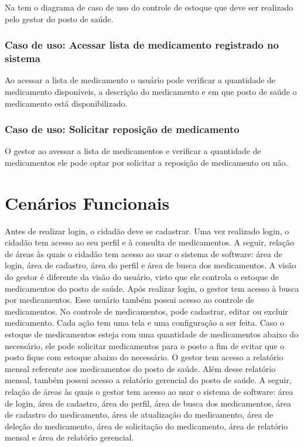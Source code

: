 Na  tem o diagrama de caso de uso do controle de estoque que deve ser realizado pelo gestor do posto de saúde.



\subsubsection{Caso de uso: Acessar lista de medicamento registrado no sistema}

Ao acessar a lista de medicamento o usuário pode verificar a quantidade de medicamento disponíveis, a descrição do medicamento e em que posto de saúde o medicamento está disponibilizado.

\subsubsection{Caso de uso: Solicitar reposição de medicamento}

O gestor ao avessar a lista de medicamentos e verificar a quantidade de medicamentos ele pode optar por solicitar a reposição de medicamento ou não.



\section{Cenários Funcionais}

Antes de realizar login, o cidadão deve se cadastrar. Uma vez realizado login, o cidadão tem acesso ao seu perfil e à consulta de medicamentos. A seguir, relação de áreas às quais o cidadão tem acesso ao usar o sistema de software: área de login, área de cadastro, área do perfil e área de busca dos medicamentos. A visão do gestor é diferente da visão do usuário, visto que ele controla o estoque de medicamentos do posto de saúde. Após realizar login, o gestor tem acesso à busca por medicamentos. Esse usuário também possui acesso ao controle de medicamentos. No controle de medicamentos, pode cadastrar, editar ou excluir medicamento. Cada ação tem uma tela e uma configuração a ser feita. Caso o estoque de medicamentos esteja com uma quantidade de medicamentos abaixo do necessário, ele pode solicitar medicamentos para o posto a fim de evitar que o posto fique com estoque abaixo do necessário. O gestor tem acesso a relatório mensal referente aos medicamentos do posto de saúde. Além desse relatório mensal, também possui acesso a relatório gerencial do posto de saúde. A seguir, relação de áreas às quais o gestor tem acesso ao usar o sistema de software: área de login, área de cadastro, área do perfil, área de busca dos medicamentos, área de cadastro do medicamento, área de atualização do medicamento, área de deleção do medicamento, área de solicitação do medicamento, área de relatório mensal e área de relatório gerencial.

